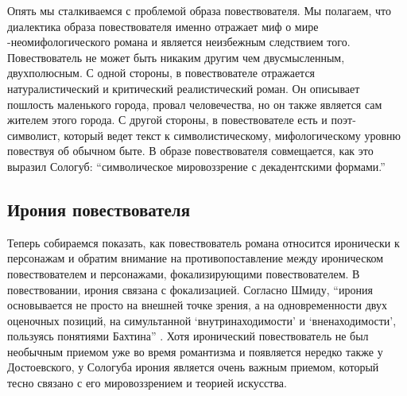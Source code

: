 \documentclass[12pt,a4paper]{article}
\begin{document}
Опять мы сталкиваемся с проблемой образа повествователя. Мы полагаем, что диалектика образа повествователя именно отражает миф о мире -неомифологического романа и является неизбежным следствием того. Повествователь не может быть никаким другим чем двусмысленным, двухполюсным. С одной стороны, в повествователе отражается натуралистический и критический реалистический роман. Он описывает пошлость маленького города, провал человечества, но он также является сам жителем этого города. С другой стороны, в повествователе есть и поэт-символист, который ведет текст к символистическому, мифологическому уровню повествуя об обычном быте. В образе повествователя совмещается, как это выразил Сологуб: \enquote{символическое мировоззрение с декадентскими формами.} %











\subsection{Ирония повествователя}


Теперь собираемся показать, как повествователь романа относится иронически к персонажам и обратим внимание на противопоставление
между ироническом повествователем и персонажами, фокализирующими повествователем. В повествовании, ирония связана с фокализацией. Согласно Шмиду, \enquote{ирония основывается не просто на внешней точке зрения, а на одновременности двух оценочных позиций, на симультанной \enquote{внутринаходимости} и \enquote{вненаходимости}, пользуясь понятиями Бахтина} \parencite[118]{schmid2008}.  Хотя иронический повествователь не был необычным приемом уже во время романтизма и появляется нередко также у Достоевского, у Сологуба ирония является очень важным приемом, который тесно связано с его мировоззрением и теорией искусства.
\end{document}
